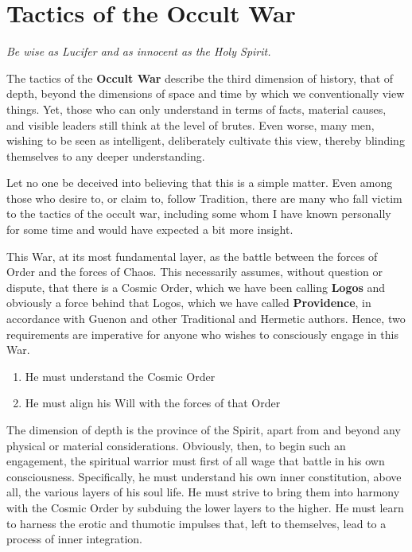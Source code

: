 \section{Tactics of the Occult War}

\begin{quotex}
\emph{Be wise as Lucifer and as innocent as the Holy Spirit.}
\end{quotex}

The tactics of the \textbf{Occult War} describe the third dimension of history, that of depth, beyond the dimensions of space and time by which we conventionally view things. Yet, those who can only understand in terms of facts, material causes, and visible leaders still think at the level of brutes. Even worse, many men, wishing to be seen as intelligent, deliberately cultivate this view, thereby blinding themselves to any deeper understanding.

Let no one be deceived into believing that this is a simple matter. Even among those who desire to, or claim to, follow Tradition, there are many who fall victim to the tactics of the occult war, including some whom I have known personally for some time and would have expected a bit more insight.

This War, at its most fundamental layer, as the battle between the forces of Order and the forces of Chaos. This necessarily assumes, without question or dispute, that there is a Cosmic Order, which we have been calling \textbf{Logos} and obviously a force behind that Logos, which we have called \textbf{Providence}, in accordance with Guenon and other Traditional and Hermetic authors. Hence, two requirements are imperative for anyone who wishes to consciously engage in this War.

\begin{enumerate}


\item He must understand the Cosmic Order

\item He must align his Will with the forces of that Order
\end{enumerate}


The dimension of depth is the province of the Spirit, apart from and beyond any physical or material considerations. Obviously, then, to begin such an engagement, the spiritual warrior must first of all wage that battle in his own consciousness. Specifically, he must understand his own inner constitution, above all, the various layers of his soul life. He must strive to bring them into harmony with the Cosmic Order by subduing the lower layers to the higher. He must learn to harness the erotic and thumotic impulses that, left to themselves, lead to a process of inner integration.

